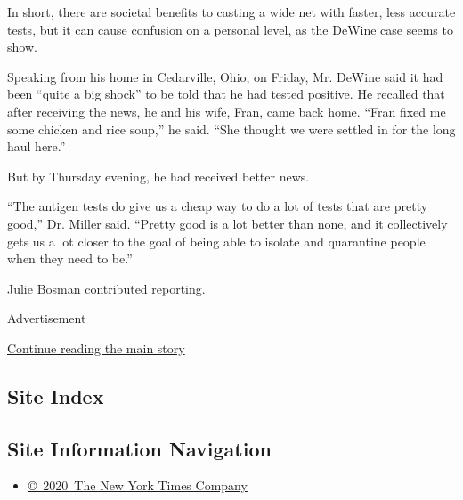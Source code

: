 In short, there are societal benefits to casting a wide net with faster,
less accurate tests, but it can cause confusion on a personal level, as
the DeWine case seems to show.

Speaking from his home in Cedarville, Ohio, on Friday, Mr. DeWine said
it had been ``quite a big shock'' to be told that he had tested
positive. He recalled that after receiving the news, he and his wife,
Fran, came back home. ``Fran fixed me some chicken and rice soup,'' he
said. ``She thought we were settled in for the long haul here.''

But by Thursday evening, he had received better news.

``The antigen tests do give us a cheap way to do a lot of tests that are
pretty good,'' Dr. Miller said. ``Pretty good is a lot better than none,
and it collectively gets us a lot closer to the goal of being able to
isolate and quarantine people when they need to be.''

Julie Bosman contributed reporting.

Advertisement

\protect\hyperlink{after-bottom}{Continue reading the main story}

\hypertarget{site-index}{%
\subsection{Site Index}\label{site-index}}

\hypertarget{site-information-navigation}{%
\subsection{Site Information
Navigation}\label{site-information-navigation}}

\begin{itemize}
\tightlist
\item
  \href{https://help.nytimes3xbfgragh.onion/hc/en-us/articles/115014792127-Copyright-notice}{©~2020~The
  New York Times Company}
\end{itemize}

